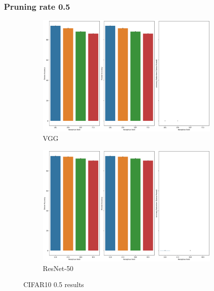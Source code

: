 \subsubsection*{Pruning rate 0.5}

\begin{figure}[h]
 \centering
     \begin{subfigure}[b]{\columnwidth}
    \includegraphics[width=1.1\columnwidth]{images/Supplementary_material/cifar10_vgg19_pruning_results_0.5.png}
    \caption{VGG}
    \label{subfig:vgg19CIfar10PR0.5}
     \end{subfigure}
      \hfill
     \begin{subfigure}[b]{\columnwidth}
    \includegraphics[width=1.1\columnwidth]{images/Supplementary_material/cifar10_resnet50_pruning_results_0.5.png}
    \caption{ResNet-50}
    \label{subfig:resenet50CIfar10PR0.5}
     \end{subfigure}
     \caption{ CIFAR10 0.5 results}
    \label{fig:pr_0.5_CIFAR10}
\end{figure}


